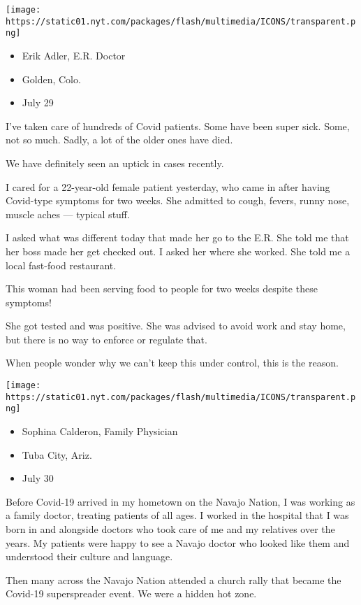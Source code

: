 \texttt{[image: https://static01.nyt.com/packages/flash/multimedia/ICONS/transparent.png]}

\begin{itemize}
\tightlist
\item
  Erik Adler, E.R. Doctor
\item
  Golden, Colo.
\item
  July 29
\end{itemize}

I've taken care of hundreds of Covid patients. Some have been super
sick. Some, not so much. Sadly, a lot of the older ones have died.

We have definitely seen an uptick in cases recently.

I cared for a 22-year-old female patient yesterday, who came in after
having Covid-type symptoms for two weeks. She admitted to cough, fevers,
runny nose, muscle aches --- typical stuff.

I asked what was different today that made her go to the E.R. She told
me that her boss made her get checked out. I asked her where she worked.
She told me a local fast-food restaurant.

This woman had been serving food to people for two weeks despite these
symptoms!

She got tested and was positive. She was advised to avoid work and stay
home, but there is no way to enforce or regulate that.

When people wonder why we can't keep this under control, this is the
reason.

\texttt{[image: https://static01.nyt.com/packages/flash/multimedia/ICONS/transparent.png]}

\begin{itemize}
\tightlist
\item
  Sophina Calderon, Family Physician
\item
  Tuba City, Ariz.
\item
  July 30
\end{itemize}

Before Covid-19 arrived in my hometown on the Navajo Nation, I was
working as a family doctor, treating patients of all ages. I worked in
the hospital that I was born in and alongside doctors who took care of
me and my relatives over the years. My patients were happy to see a
Navajo doctor who looked like them and understood their culture and
language.

Then many across the Navajo Nation attended a church rally that became
the Covid-19 superspreader event. We were a hidden hot zone.

